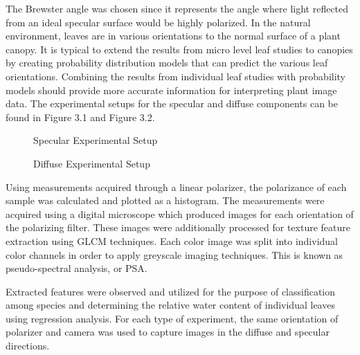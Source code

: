 The Brewster angle was chosen since it represents the angle where light reflected from an ideal specular surface would be highly polarized.  In the natural environment, leaves are in various orientations to the normal surface of a plant canopy.  It is typical to extend the results from micro level leaf studies to canopies by creating probability distribution models that can predict the various leaf orientations.  Combining the results from individual leaf studies with probability models should provide more accurate information for interpreting plant image data. The experimental setups for the specular and diffuse components can be found in  Figure 3.1 and Figure 3.2.
%
\begin{figure}[!htb]
    \begin{center}
    \end{center}
    \caption{Specular Experimental Setup}
    \label{fig:Experiment}
\end{figure}
\begin{figure}[!htb]
    \begin{center}
    \end{center}
    \caption{Diffuse Experimental Setup}
    \label{fig:Experiment}
\end{figure}
%
Using measurements acquired through a linear polarizer, the polarizance of each sample was calculated and plotted as a histogram.  The measurements were acquired using a digital microscope which produced images for each orientation of the polarizing filter.  These images were additionally processed for texture feature extraction using GLCM techniques.
Each color image was split into individual color channels in order to apply greyscale imaging techniques. This is known as pseudo-spectral analysis, or PSA.

Extracted features were observed and utilized for the purpose of classification among species and determining the relative water content of individual leaves using regression analysis.  For each type of experiment, the same orientation of polarizer and camera was used to capture images in the diffuse and specular directions.
